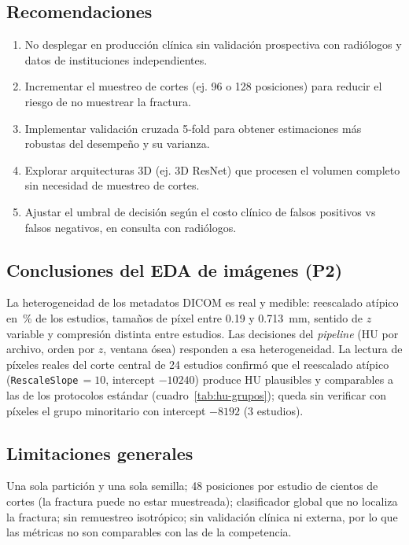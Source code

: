 \subsection*{Recomendaciones}

\begin{enumerate}[nosep]
\item No desplegar en producci\'on cl\'inica sin validaci\'on prospectiva con radi\'ologos y datos de instituciones independientes.
\item Incrementar el muestreo de cortes (ej. 96 o 128 posiciones) para reducir el riesgo de no muestrear la fractura.
\item Implementar validaci\'on cruzada 5-fold para obtener estimaciones m\'as robustas del desempe\~no y su varianza.
\item Explorar arquitecturas 3D (ej. 3D ResNet) que procesen el volumen completo sin necesidad de muestreo de cortes.
\item Ajustar el umbral de decisi\'on seg\'un el costo cl\'inico de falsos positivos vs falsos negativos, en consulta con radi\'ologos.
\end{enumerate}

\subsection*{Conclusiones del EDA de im\'agenes (P2)}
La heterogeneidad de los metadatos DICOM es real y medible: reescalado at\'ipico en \cifNInterceptAtipPct\,\% de los estudios, tama\~nos de p\'ixel entre 0.19 y 0.713~mm, sentido de $z$ variable y compresi\'on distinta entre estudios. Las decisiones del \emph{pipeline} (HU por archivo, orden por $z$, ventana \'osea) responden a esa heterogeneidad. La lectura de p\'ixeles reales del corte central de 24 estudios confirm\'o que el reescalado at\'ipico (\texttt{RescaleSlope}\,$=10$, intercept $-10240$) produce HU plausibles y comparables a las de los protocolos est\'andar (cuadro~\ref{tab:hu-grupos}); queda sin verificar con p\'ixeles el grupo minoritario con intercept $-8192$ (3 estudios).

\subsection*{Limitaciones generales}
Una sola partici\'on y una sola semilla; 48 posiciones por estudio de cientos de cortes (la fractura puede no estar muestreada); clasificador global que no localiza la fractura; sin remuestreo isotr\'opico; sin validaci\'on cl\'inica ni externa, por lo que las m\'etricas no son comparables con las de la competencia.
